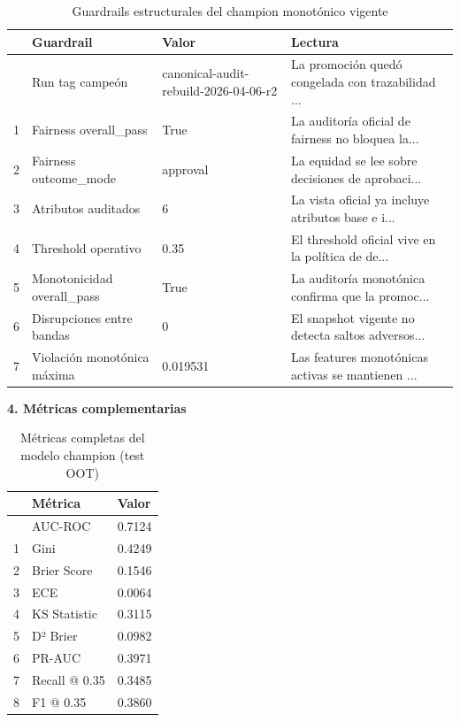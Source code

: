 \documentclass[
  spanish,
  11pt,
  letterpaper,
]{scrbook}
\theoremstyle{plain}
\theoremstyle{remark}
\begin{document}
{

\begin{longtable}[]{@{}llll@{}}

\caption{\label{tbl-champion-structural-guardrails}Guardrails
estructurales del champion monotónico vigente}

\tabularnewline

\toprule\noalign{}
& Guardrail & Valor & Lectura \\
\midrule\noalign{}
\endhead
\bottomrule\noalign{}
\endlastfoot
0 & Run tag campeón & canonical-audit-rebuild-2026-04-06-r2 & La
promoción quedó congelada con trazabilidad ... \\
1 & Fairness overall\_pass & True & La auditoría oficial de fairness no
bloquea la... \\
2 & Fairness outcome\_mode & approval & La equidad se lee sobre
decisiones de aprobaci... \\
3 & Atributos auditados & 6 & La vista oficial ya incluye atributos base
e i... \\
4 & Threshold operativo & 0.35 & El threshold oficial vive en la
política de de... \\
5 & Monotonicidad overall\_pass & True & La auditoría monotónica
confirma que la promoc... \\
6 & Disrupciones entre bandas & 0 & El snapshot vigente no detecta
saltos adversos... \\
7 & Violación monotónica máxima & 0.019531 & Las features monotónicas
activas se mantienen ... \\

\end{longtable}

}

\textbf{4. Métricas complementarias}

{

\begin{longtable}[]{@{}lll@{}}

\caption{\label{tbl-champion-metrics}Métricas completas del modelo
champion (test OOT)}

\tabularnewline

\toprule\noalign{}
& Métrica & Valor \\
\midrule\noalign{}
\endhead
\bottomrule\noalign{}
\endlastfoot
0 & AUC-ROC & 0.7124 \\
1 & Gini & 0.4249 \\
2 & Brier Score & 0.1546 \\
3 & ECE & 0.0064 \\
4 & KS Statistic & 0.3115 \\
5 & D² Brier & 0.0982 \\
6 & PR-AUC & 0.3971 \\
7 & Recall @ 0.35 & 0.3485 \\
8 & F1 @ 0.35 & 0.3860 \\

\end{longtable}

}
\end{document}
